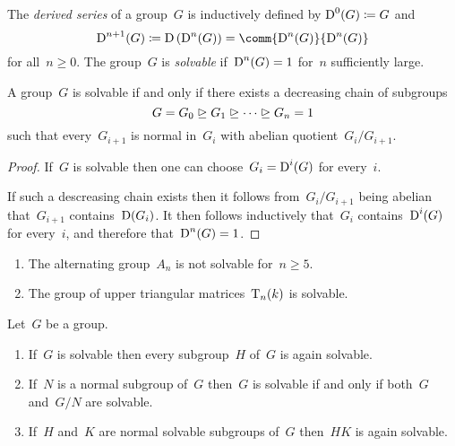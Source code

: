 \begin{definition}
  The \emph{derived series} of a group~$G$ is inductively defined by $\operatorname{D}^0(G) \coloneqq G$ and
  \[
              \Derived^{n+1}(G)
    \defined  \Derived\left( \Derived^n(G) \right)
    =         \comm{ \Derived^n(G) }{ \Derived^n(G) }
  \]
  for all~$n \geq 0$.
  The group~$G$ is \emph{solvable} if~$\operatorname{D}^n(G) = 1$ for~$n$ sufficiently large.
\end{definition}


\begin{lemma}
  A group~$G$ is solvable if and only if there exists a decreasing chain of subgroups
  \[
                G
    =           G_0
    \trianglerighteq  G_1
    \trianglerighteq  \dotsb
    \trianglerighteq  G_n
    =           1
  \]
  such that every~$G_{i+1}$ is normal in~$G_i$ with abelian quotient~$G_i/G_{i+1}$.
\end{lemma}


\begin{proof}
  If~$G$ is solvable then one can choose~$G_i = \operatorname{D}^i(G)$ for every~$i$.
  
  If such a descreasing chain exists then it follows from~$G_i/G_{i+1}$ being abelian that~$G_{i+1}$ contains~$\operatorname{D}(G_i)$.
  It then follows inductively that~$G_i$ contains~$\operatorname{D}^i(G)$ for every~$i$, and therefore that~$\operatorname{D}^n(G) = 1$.
\end{proof}


\begin{example}
  \leavevmode
  \begin{enumerate}
    \item
      The alternating group~$A_n$ is not solvable for~$n \geq 5$.
    \item
      The group of upper triangular matrices~$\operatorname{T}_n(k)$ is solvable.
  \end{enumerate}
\end{example}


\begin{lemma}
  Let~$G$ be a group.
  \begin{enumerate}
    \item
      If~$G$ is solvable then every subgroup~$H$ of~$G$ is again solvable.
    \item
      If~$N$ is a normal subgroup of~$G$ then~$G$ is solvable if and only if both~$G$ and~$G/N$ are solvable.
    \item
      If~$H$ and~$K$ are normal solvable subgroups of~$G$ then~$HK$ is again solvable.
  \end{enumerate}
\end{lemma}


